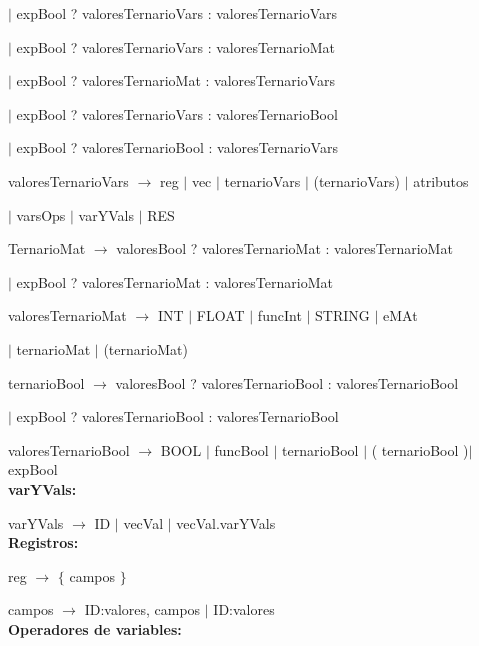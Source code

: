   \hspace{15mm}$|$  expBool ? valoresTernarioVars : valoresTernarioVars
  
  \hspace{15mm}$|$  expBool ? valoresTernarioVars : valoresTernarioMat 
  
  \hspace{15mm}$|$  expBool ? valoresTernarioMat : valoresTernarioVars
  
  \hspace{15mm}$|$  expBool ? valoresTernarioVars : valoresTernarioBool 
  
  \hspace{15mm}$|$  expBool ? valoresTernarioBool : valoresTernarioVars  
  

  
valoresTernarioVars $\rightarrow$ reg $|$ vec $|$ ternarioVars $|$ (ternarioVars) $|$ atributos 

\hspace{15mm}$|$ varsOps  $|$ varYVals $|$ RES

TernarioMat $\rightarrow$ valoresBool ? valoresTernarioMat : valoresTernarioMat  

\hspace{15mm}$|$ expBool ? valoresTernarioMat : valoresTernarioMat
  
valoresTernarioMat $\rightarrow$ INT $|$ FLOAT $|$ funcInt $|$ STRING $|$ eMAt 

\hspace{15mm}$|$ ternarioMat $|$ (ternarioMat)

ternarioBool $\rightarrow$ valoresBool ? valoresTernarioBool : valoresTernarioBool  

\hspace{15mm}$|$ expBool ? valoresTernarioBool : valoresTernarioBool
  
valoresTernarioBool $\rightarrow$ BOOL $|$ funcBool $|$ ternarioBool $|$ ( ternarioBool )$|$ expBool \\
   

\textbf{varYVals:}

varYVals $\rightarrow$ ID $|$ vecVal $|$ vecVal.varYVals \\


\textbf{Registros:} 

reg $\rightarrow$ $\{$ campos $\}$

campos $\rightarrow$ ID:valores, campos $|$ ID:valores \\


\textbf{Operadores de variables:}

